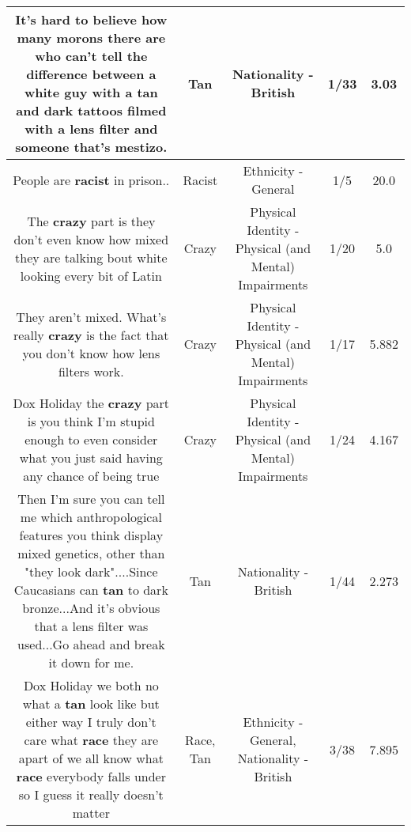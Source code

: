 \documentclass[11pt]{article}
\newlength\mylength
\begin{document}
\begin{center}
\begin{longtable}{|C{.65\mylength}|C{.30\mylength}|C{.12\mylength}|C{.12\mylength}|C{.12\mylength}|}
  \small It's hard to believe how many morons there are who can't tell the difference between a white guy with a \textbf{tan} and dark tattoos filmed with a lens filter and someone that's mestizo.\normalsize   & Tan & Nationality - British & 1/33 & 3.03 \\  \hline
  \small People are \textbf{racist} in prison..\normalsize   & Racist & Ethnicity - General & 1/5 & 20.0 \\  \hline
  \small The \textbf{crazy} part is they don't even know how mixed they are talking bout white looking every bit of Latin\normalsize   & Crazy & Physical Identity - Physical (and Mental) Impairments & 1/20 & 5.0 \\  \hline
  \small They aren't mixed. What's really \textbf{crazy} is the fact that you don't know how lens filters work.\normalsize   & Crazy & Physical Identity - Physical (and Mental) Impairments & 1/17 & 5.882 \\  \hline
  \small Dox Holiday the \textbf{crazy} part is you think I'm stupid enough to even consider what you just said having any chance of being true\normalsize   & Crazy & Physical Identity - Physical (and Mental) Impairments & 1/24 & 4.167 \\  \hline
  \small Then I'm sure you can tell me which anthropological features you think display mixed genetics, other than "they look dark"....Since Caucasians can \textbf{tan} to dark bronze...And it's obvious that a lens filter was used...Go ahead and break it down for me.\normalsize   & Tan & Nationality - British & 1/44 & 2.273 \\  \hline
  \small Dox Holiday we both no what a \textbf{tan} look like but either way I truly don't care what \textbf{race} they are apart of we all know what \textbf{race} everybody falls under so I guess it really doesn't matter\normalsize   & Race, Tan & Ethnicity - General, Nationality - British & 3/38 & 7.895 \\  \hline

\end{longtable}
\end{center}
\end{document}
